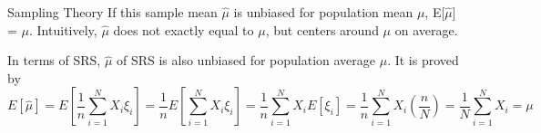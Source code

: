\documentclass[12pt]{article}
\begin{document}
\begin{section}{Sampling Theory}
If this sample mean $\hat{\mu}$ is unbiased for population mean $\mu$, E[$\hat{\mu}$] = $\mu$. Intuitively, $\hat{\mu}$ does not exactly equal to $\mu$, but centers around $\mu$ on average. 

In terms of SRS, $\hat{\mu}$ of SRS is also unbiased for population average $\mu$. It is proved by 
$$E[\hat{\mu}] = E[\frac{1}{n} \sum\limits_{i=1}^N X_i \xi_i] = \frac{1}{n} E[\sum\limits_{i=1}^N X_i \xi_i] = \frac{1}{n} \sum\limits_{i=1}^N X_i E[\xi_i] = \frac{1}{n} \sum\limits_{i=1}^N X_i (\frac{n}{N}) = \frac{1}{N} \sum\limits_{i=1}^N X_i = \mu $$

\end{section}
\end{document}
